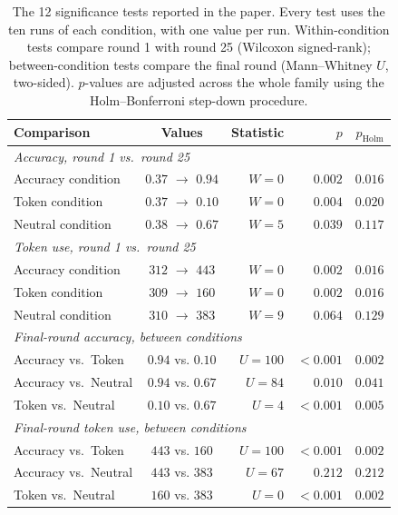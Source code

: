 \begin{table}[t]
  \caption{The 12 significance tests reported in the paper. Every test uses the ten runs of each condition, with one value per run. Within-condition tests compare round 1 with round 25 (Wilcoxon signed-rank); between-condition tests compare the final round (Mann--Whitney $U$, two-sided). $p$-values are adjusted across the whole family using the Holm--Bonferroni step-down procedure.}
  \label{tab:stats}
  \centering
  \small
  \begin{tabular}{l c r r r}
    \toprule
    Comparison & Values & Statistic & $p$ & $p_{\text{Holm}}$ \\
    \midrule
    \multicolumn{5}{l}{\emph{Accuracy, round 1 vs.\ round 25}} \\
    \quad Accuracy condition & $0.37$ $\rightarrow$ $0.94$ & $W=0$ & $0.002$ & $0.016$ \\
    \quad Token condition & $0.37$ $\rightarrow$ $0.10$ & $W=0$ & $0.004$ & $0.020$ \\
    \quad Neutral condition & $0.38$ $\rightarrow$ $0.67$ & $W=5$ & $0.039$ & $0.117$ \\
    \midrule
    \multicolumn{5}{l}{\emph{Token use, round 1 vs.\ round 25}} \\
    \quad Accuracy condition & $312$ $\rightarrow$ $443$ & $W=0$ & $0.002$ & $0.016$ \\
    \quad Token condition & $309$ $\rightarrow$ $160$ & $W=0$ & $0.002$ & $0.016$ \\
    \quad Neutral condition & $310$ $\rightarrow$ $383$ & $W=9$ & $0.064$ & $0.129$ \\
    \midrule
    \multicolumn{5}{l}{\emph{Final-round accuracy, between conditions}} \\
    \quad Accuracy vs.\ Token & $0.94$ vs. $0.10$ & $U=100$ & $<0.001$ & $0.002$ \\
    \quad Accuracy vs.\ Neutral & $0.94$ vs. $0.67$ & $U=84$ & $0.010$ & $0.041$ \\
    \quad Token vs.\ Neutral & $0.10$ vs. $0.67$ & $U=4$ & $<0.001$ & $0.005$ \\
    \midrule
    \multicolumn{5}{l}{\emph{Final-round token use, between conditions}} \\
    \quad Accuracy vs.\ Token & $443$ vs. $160$ & $U=100$ & $<0.001$ & $0.002$ \\
    \quad Accuracy vs.\ Neutral & $443$ vs. $383$ & $U=67$ & $0.212$ & $0.212$ \\
    \quad Token vs.\ Neutral & $160$ vs. $383$ & $U=0$ & $<0.001$ & $0.002$ \\
    \bottomrule
  \end{tabular}
\end{table}
